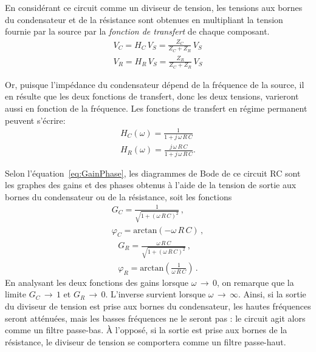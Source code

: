 \documentclass[canadien,12pt,oneside,letterpaper]{article}
\begin{document}
En considérant ce circuit comme un diviseur de tension, les tensions aux bornes du condensateur et de la résistance sont obtenues en multipliant la tension fournie par la source par la \textit{fonction de transfert} de chaque composant.
\begin{gather}
V_C=H_C\,V_S=\frac{Z_C}{Z_C+Z_R}\,V_S\\
V_R=H_R\,V_S=\frac{Z_R}{Z_C+Z_R}\,V_S
\end{gather}

Or, puisque l'impédance du condensateur dépend de la fréquence de la source, il en résulte que les deux fonctions de transfert, donc les deux tensions, varieront aussi en fonction de la fréquence. Les fonctions de transfert en régime permanent peuvent s'écrire:
\begin{gather}
H_C\!\left(\omega\right)=\frac{1}{1+j\,\omega\,R\,C}\\
H_R\!\left(\omega\right)=\frac{j\,\omega\,R\,C}{1+j\,\omega\,R\,C}.
\end{gather}

Selon l'équation~\eqref{eq:GainPhase}, les diagrammes de Bode de ce circuit RC sont les graphes des gains et des phases obtenus à l'aide de la tension de sortie aux bornes du condensateur ou de la résistance, soit les fonctions
\begin{subequations}
\begin{gather}
G_C=\frac{1}{\sqrt{1+\left(\omega\,R\,C\right)^2}}\,,\\
\varphi_C=\mathrm{arctan}\!\left(-\omega\,R\,C\right)\,,
\end{gather}
\end{subequations}
\begin{subequations}
\begin{gather}
G_R=\frac{\omega\,R\,C}{\sqrt{1+\left(\omega\,R\,C\right)^2}}\,,\\
\varphi_R=\mathrm{arctan}\!\left(\frac{1}{\omega\,R\,C}\right)\,.
\end{gather}
\end{subequations}
En analysant les deux fonctions des gains lorsque $\omega\,\rightarrow\,0$, on remarque que la limite $G_C\,\rightarrow\,1$ et $G_R\,\rightarrow\,0$. L'inverse survient lorsque $\omega\,\rightarrow\,\infty$. Ainsi, si la sortie du diviseur de tension est prise aux bornes du condensateur, les hautes fréquences seront atténuées, mais les basses fréquences ne le seront pas : le circuit agit alors comme un filtre passe-bas. À l'opposé, si la sortie est prise aux bornes de la résistance, le diviseur de tension se comportera comme un filtre passe-haut.
\end{document}
